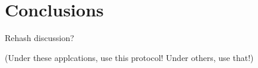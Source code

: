 \documentclass[twocolumn]{article}
\begin{document}
%

\section*{Conclusions}

Rehash discussion?

(Under these applcations, use this protocol! Under others, use that!)

\end{document}

